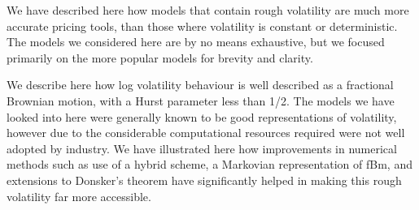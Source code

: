 \documentclass[12pt,oneside]{article}
\begin{document}
We have described here how models that contain rough volatility are much more accurate pricing tools, than those where volatility is constant or deterministic. The models we considered here are by no means exhaustive, but we focused primarily on the more popular models for brevity and clarity. 

We describe here how log volatility behaviour is well described as a fractional Brownian motion, with a Hurst parameter less than 1/2. The models we have looked into here were generally known to be good representations of volatility, however due to the considerable computational resources required were not well adopted by industry. We have illustrated here how improvements in numerical methods such as use of a hybrid scheme, a Markovian representation of fBm, and extensions to Donsker's theorem have significantly helped in making this rough volatility far more accessible. 






\end{document}
